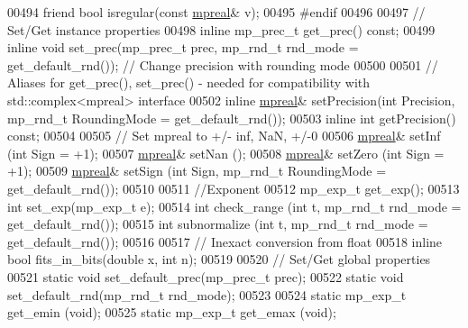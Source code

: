 \begin{DoxyCode}
00494     \textcolor{keyword}{friend} \textcolor{keywordtype}{bool} isregular(\textcolor{keyword}{const} \hyperlink{classmpfr_1_1mpreal}{mpreal}& v);
00495 \textcolor{preprocessor}{#endif}
00496 
00497     \textcolor{comment}{// Set/Get instance properties}
00498     \textcolor{keyword}{inline} mp\_prec\_t    get\_prec() \textcolor{keyword}{const};
00499     \textcolor{keyword}{inline} \textcolor{keywordtype}{void}         set\_prec(mp\_prec\_t prec, mp\_rnd\_t rnd\_mode = get\_default\_rnd());    \textcolor{comment}{// Change
       precision with rounding mode}
00500 
00501     \textcolor{comment}{// Aliases for get\_prec(), set\_prec() - needed for compatibility with std::complex<mpreal> interface}
00502     \textcolor{keyword}{inline} \hyperlink{classmpfr_1_1mpreal}{mpreal}&      setPrecision(\textcolor{keywordtype}{int} Precision, mp\_rnd\_t RoundingMode = get\_default\_rnd());
00503     \textcolor{keyword}{inline} \textcolor{keywordtype}{int}          getPrecision() \textcolor{keyword}{const};
00504 
00505     \textcolor{comment}{// Set mpreal to +/- inf, NaN, +/-0}
00506     \hyperlink{classmpfr_1_1mpreal}{mpreal}&        setInf  (\textcolor{keywordtype}{int} Sign = +1);
00507     \hyperlink{classmpfr_1_1mpreal}{mpreal}&        setNan  ();
00508     \hyperlink{classmpfr_1_1mpreal}{mpreal}&        setZero (\textcolor{keywordtype}{int} Sign = +1);
00509     \hyperlink{classmpfr_1_1mpreal}{mpreal}&        setSign (\textcolor{keywordtype}{int} Sign, mp\_rnd\_t RoundingMode = get\_default\_rnd());
00510 
00511     \textcolor{comment}{//Exponent}
00512     mp\_exp\_t get\_exp();
00513     \textcolor{keywordtype}{int} set\_exp(mp\_exp\_t e);
00514     \textcolor{keywordtype}{int} check\_range  (\textcolor{keywordtype}{int} t, mp\_rnd\_t rnd\_mode = get\_default\_rnd());
00515     \textcolor{keywordtype}{int} subnormalize (\textcolor{keywordtype}{int} t, mp\_rnd\_t rnd\_mode = get\_default\_rnd());
00516 
00517     \textcolor{comment}{// Inexact conversion from float}
00518     \textcolor{keyword}{inline} \textcolor{keywordtype}{bool} fits\_in\_bits(\textcolor{keywordtype}{double} x, \textcolor{keywordtype}{int} n);
00519 
00520     \textcolor{comment}{// Set/Get global properties}
00521     \textcolor{keyword}{static} \textcolor{keywordtype}{void}            set\_default\_prec(mp\_prec\_t prec);
00522     \textcolor{keyword}{static} \textcolor{keywordtype}{void}            set\_default\_rnd(mp\_rnd\_t rnd\_mode);
00523 
00524     \textcolor{keyword}{static} mp\_exp\_t  get\_emin (\textcolor{keywordtype}{void});
00525     \textcolor{keyword}{static} mp\_exp\_t  get\_emax (\textcolor{keywordtype}{void});

\end{DoxyCode}
